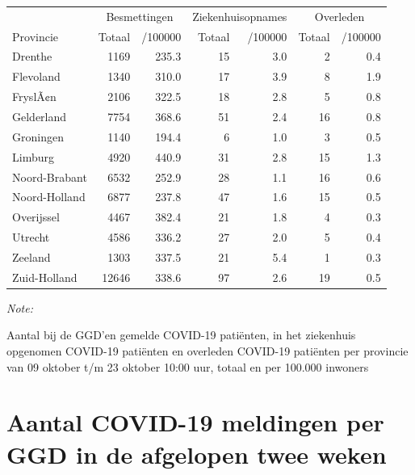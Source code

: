 \documentclass[
  english,
  man,floatsintext]{apa6}
\begin{document}
\begin{table}
\centering
\begin{threeparttable}
\begin{tabular}{lrrrrrr}
\toprule
\multicolumn{1}{c}{ } & \multicolumn{2}{c}{Besmettingen} & \multicolumn{2}{c}{Ziekenhuisopnames} & \multicolumn{2}{c}{Overleden} \\
\cmidrule(l{3pt}r{3pt}){2-3} \cmidrule(l{3pt}r{3pt}){4-5} \cmidrule(l{3pt}r{3pt}){6-7}
Provincie & Totaal & /100000 & Totaal & /100000 & Totaal & /100000\\
\midrule
Drenthe & 1169 & 235.3 & 15 & 3.0 & 2 & 0.4\\
Flevoland & 1340 & 310.0 & 17 & 3.9 & 8 & 1.9\\
FryslÃ¢n & 2106 & 322.5 & 18 & 2.8 & 5 & 0.8\\
Gelderland & 7754 & 368.6 & 51 & 2.4 & 16 & 0.8\\
Groningen & 1140 & 194.4 & 6 & 1.0 & 3 & 0.5\\
Limburg & 4920 & 440.9 & 31 & 2.8 & 15 & 1.3\\
Noord-Brabant & 6532 & 252.9 & 28 & 1.1 & 16 & 0.6\\
Noord-Holland & 6877 & 237.8 & 47 & 1.6 & 15 & 0.5\\
Overijssel & 4467 & 382.4 & 21 & 1.8 & 4 & 0.3\\
Utrecht & 4586 & 336.2 & 27 & 2.0 & 5 & 0.4\\
Zeeland & 1303 & 337.5 & 21 & 5.4 & 1 & 0.3\\
Zuid-Holland & 12646 & 338.6 & 97 & 2.6 & 19 & 0.5\\
\bottomrule
\end{tabular}
\begin{tablenotes}
\item \textit{Note: } 
\item Aantal bij de GGD’en gemelde COVID-19 patiënten, in het ziekenhuis opgenomen COVID-19 patiënten en overleden COVID-19 patiënten per provincie van 09 oktober t/m 23 oktober 10:00 uur, totaal en per 100.000 inwoners
\end{tablenotes}
\end{threeparttable}
\end{table}

\newpage

\hypertarget{aantal-covid-19-meldingen-per-ggd-in-de-afgelopen-twee-weken}{%
\section{Aantal COVID-19 meldingen per GGD in de afgelopen twee weken}\label{aantal-covid-19-meldingen-per-ggd-in-de-afgelopen-twee-weken}}
\end{document}
